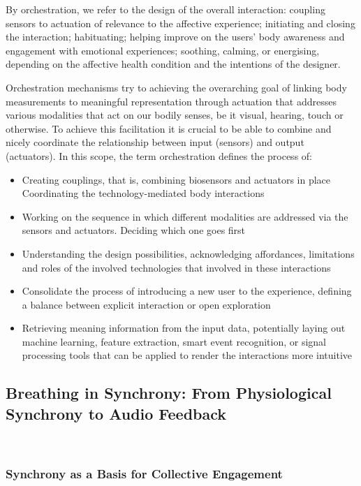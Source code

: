 By orchestration, we refer to the design of the overall interaction: coupling sensors to actuation of relevance to the affective experience; initiating and closing the interaction; habituating; helping improve on the users' body awareness and engagement with emotional experiences; soothing, calming, or energising, depending on the affective health condition and the intentions of the designer.

Orchestration mechanisms try to achieving the overarching goal of linking body measurements to meaningful representation through actuation that addresses various modalities that act on our bodily senses, be it visual, hearing, touch or otherwise. To achieve this facilitation it is crucial to be able to combine and nicely coordinate the relationship between input (sensors) and output (actuators). In this scope, the term orchestration defines the process of:
\begin{itemize}
    \item Creating couplings, that is, combining biosensors and actuators in place
    Coordinating the technology-mediated body interactions
    \item Working on the sequence in which different modalities are addressed via the sensors and actuators. Deciding which one goes first
    \item Understanding the design possibilities, acknowledging affordances, limitations and roles of the involved technologies that involved in these interactions
    \item Consolidate the process of introducing a new user to the experience, defining a balance between explicit interaction or open exploration
    \item Retrieving meaning information from the input data, potentially laying out machine learning, feature extraction, smart event recognition, or signal processing tools that can be applied to render the interactions more intuitive
\end{itemize}

\subsection{Breathing in Synchrony: From Physiological Synchrony to Audio Feedback}\
\label{sec:breathing_synchrony}

\subsubsection*{Synchrony as a Basis for Collective Engagement}

